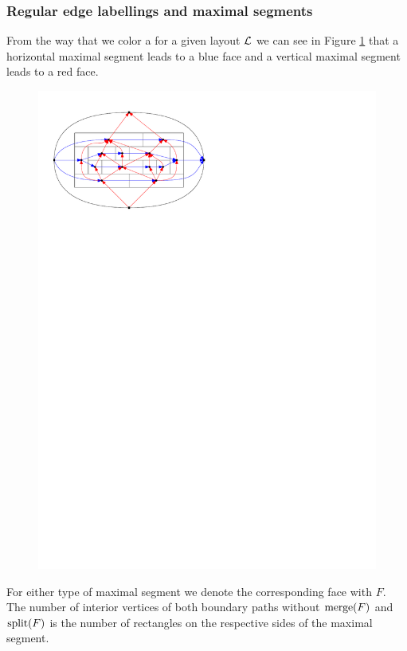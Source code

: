   \subsubsection{Regular edge labellings and maximal segments}
    From the way that we color a \rel for a given layout $\mathcal{L}$ we can see in Figure \ref{fig:rect:relSegmentFace} that a horizontal maximal segment leads to a blue face and a vertical maximal segment leads to a red face.

    \begin{figure}[h]
      \centering
      \includegraphics[scale=1]{rectangularDuals/img/relSegmentFaceRescale}
      \caption{}
      \label{fig:rect:relSegmentFace}
    \end{figure}

    For either type of maximal segment we denote the corresponding face with $F$. The number of interior vertices of both boundary paths without $\operatorname{merge}(F)$ and $\operatorname{split}(F)$ is the number of rectangles on the respective sides of the maximal segment.

